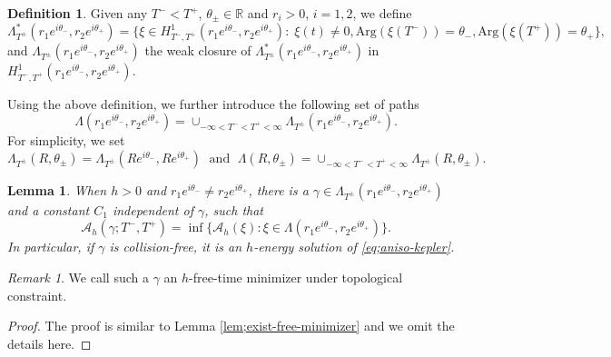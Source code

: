 \documentclass[11pt]{amsart}
\newcommand{\rr}{\mathbb R}
\newcommand{\A}{\mathcal A}
\newcommand{\gm}{\gamma}
\newcommand{\tht}{\theta}
\newcommand{\Lmd}{\Lambda}
\theoremstyle{plain}
\newtheorem{lem}{Lemma}[section]
\theoremstyle{definition}
\newtheorem{dfn}{Definition}[section]
\theoremstyle{remark}
\newtheorem{rem}{Remark}[section]
\begin{document}
\begin{dfn}
Given any $T^- <T^+$, $\tht_{\pm} \in \rr$ and $r_i>0$, $i =1, 2$, we define 
$$ \Lmd^*_{T^{\pm}}(r_1 e^{i\tht_-}, r_2 e^{i\tht_+}) =\{ \xi \in H_{T^-, T^+}^1(r_1 e^{i\tht_-}, r_2 e^{i\tht_+}) : \; \xi(t) \ne 0,  \text{Arg}(\xi(T^-)) = \tht_-, \text{Arg}(\xi(T^+)) = \tht_+ \},$$
and $\Lmd_{T^{\pm}}(r_1 e^{i\tht_-}, r_2 e^{i\tht_+})$ the weak closure of $\Lmd^*_{T^{\pm}}(r_1 e^{i\tht_-}, r_2 e^{i\tht_+}) $ in $ H_{T^-, T^+}^1(r_1 e^{i\tht_-}, r_2 e^{i\tht_+})$.
\end{dfn}
Using the above definition, we further introduce the following set of paths
$$ \Lmd(r_1 e^{i \tht_-}, r_2 e^{i \tht_+}) = \cup_{-\infty < T^- < T^+ < \infty} \Lmd_{T^{\pm}}(r_1 e^{i\tht_-}, r_2 e^{i\tht_+}). $$
For simplicity, we set
$$ \Lmd_{T^{\pm}}(R, \tht_{\pm}) = \Lmd_{T^{\pm}}(R e^{i \tht_-}, R e^{i \tht_+}) \;  \text{ and } \; \Lmd(R, \tht_{\pm}) = \cup_{-\infty < T^- < T^+ < \infty} \Lmd_{T^{\pm}}(R, \tht_{\pm}). $$


\begin{lem}
\label{lem;free-minimizer-top} When $h>0$ and $r_1 e^{i \tht_-} \ne r_2 e^{i \tht_+}$,  there is a $\gm \in \Lmd_{T^{\pm}}(r_1 e^{i\tht_-}, r_2 e^{i \tht_+})$ and a constant $C_1$ independent of $\gm$, such that  
$$ \A_h(\gm; T^-, T^+) = \inf \{ \A_h(\xi): \xi \in \Lmd(r_1 e^{i \tht_-}, r_2 e^{i \tht_+}) \}.$$
In particular, if $\gm$ is collision-free, it is an $h$-energy solution of \eqref{eq;aniso-kepler}. 
\end{lem}

\begin{rem}
We call such a $\gm$ an $h$-free-time minimizer under topological constraint.  
\end{rem}

\begin{proof} The proof is similar to Lemma \ref{lem;exist-free-minimizer} and we omit the details here. 



 

\end{proof}
\end{document}
